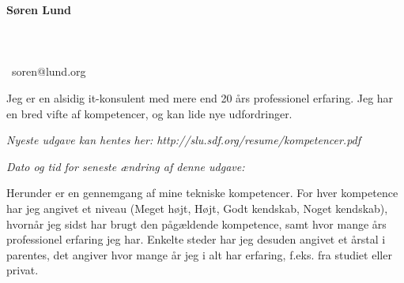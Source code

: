 \documentclass[a4paper,11pt]{article}
\newcommand\redacted{[skjult i online version]}
\newcommand\myaddressone{\redacted}
\newcommand\myaddresstwo{\redacted}
\newcommand\myphone{\redacted}
\begin{document}
\centerline{}
\centerline{}

\begin{minipage}[b]{0.30\textwidth}
  \selectfont%
  \textbf{Søren Lund} \\
  \myaddressone \\
  \myaddresstwo \\
  \myphone \\
  \Email\ soren@lund.org
\end{minipage}%
\hfill
\begin{minipage}[b]{0.30\textwidth}
  \selectfont%
  Jeg er en alsidig it-konsulent med
  mere end 20 års professionel
  erfaring. Jeg har en bred vifte af
  kompetencer, og
  kan lide nye udfordringer.
\end{minipage}

\bigskip
\centerline{\small\textit{Nyeste udgave kan hentes her: http://slu.sdf.org/resume/kompetencer.pdf}}
\centerline{\small\textit{Dato og tid for seneste ændring af denne udgave: }}

\bigskip
\bigskip

\newcommand\High{Meget højt}
\newcommand\high{Højt}
\newcommand\know{Godt kendskab}
\newcommand\some{Noget kendskab}

Herunder er en gennemgang af mine tekniske kompetencer. For hver
kompetence har jeg angivet et niveau (\High, \high, \know, \some),
hvornår jeg sidst har brugt den pågældende kompetence, samt hvor
mange års professionel erfaring jeg har. Enkelte steder har jeg
desuden angivet et årstal i parentes, det angiver hvor mange år jeg i
alt har erfaring, f.eks. fra studiet eller privat.
\end{document}
